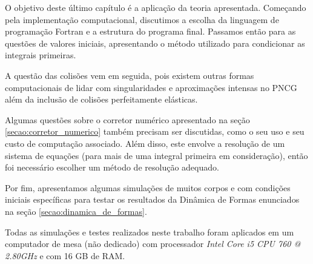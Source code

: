 %
%

O objetivo deste último capítulo é a aplicação da teoria apresentada. Começando pela implementação computacional, discutimos a escolha da linguagem de programação Fortran e a estrutura do programa final. Passamos então para as questões de valores iniciais, apresentando o método utilizado para condicionar as integrais primeiras.

A questão das colisões vem em seguida, pois existem outras formas computacionais de lidar com singularidades e aproximações intensas no PNCG além da inclusão de colisões perfeitamente elásticas.

Algumas questões sobre o corretor numérico apresentado na seção \ref{secao:corretor_numerico} também precisam ser discutidas, como o seu uso e seu custo de computação associado. Além disso, este envolve a resolução de um sistema de equações (para mais de uma integral primeira em consideração), então foi necessário escolher um método de resolução adequado.

Por fim, apresentamos algumas simulações de muitos corpos e com condições iniciais específicas para testar os resultados da Dinâmica de Formas enunciados na seção \ref{secao:dinamica_de_formas}.

Todas as simulações e testes realizados neste trabalho foram aplicados em um computador de mesa (não dedicado) com processador \textit{Intel Core i5 CPU 760 @ 2.80GHz} e com 16 GB de RAM.


